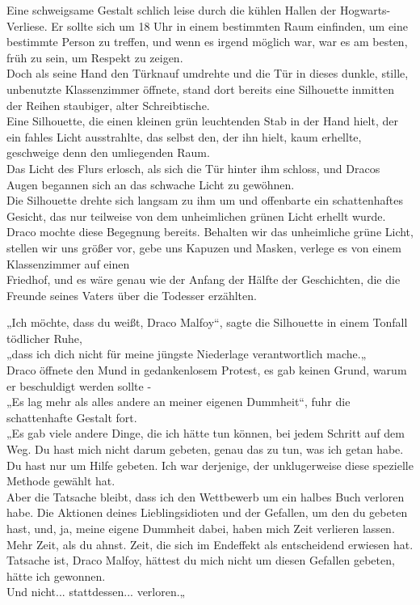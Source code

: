 {Eine schweigsame Gestalt schlich leise durch die kühlen Hallen der Hogwarts-Verliese. Er sollte sich um 18 Uhr in einem bestimmten Raum einfinden, um eine bestimmte Person zu treffen, und wenn es irgend möglich war, war es am besten, früh zu sein, um Respekt zu zeigen.\\ Doch als seine Hand den Türknauf umdrehte und die Tür in dieses dunkle, stille, unbenutzte Klassenzimmer öffnete, stand dort bereits eine Silhouette inmitten der Reihen staubiger, alter Schreibtische.\\ Eine Silhouette, die einen kleinen grün leuchtenden Stab in der Hand hielt, der ein fahles Licht ausstrahlte, das selbst den, der ihn hielt, kaum erhellte, geschweige denn den umliegenden Raum.\\ Das Licht des Flurs erlosch, als sich die Tür hinter ihm schloss, und Dracos Augen begannen sich an das schwache Licht zu gewöhnen.\\ Die Silhouette drehte sich langsam zu ihm um und offenbarte ein schattenhaftes Gesicht, das nur teilweise von dem unheimlichen grünen Licht erhellt wurde.\\ Draco mochte diese Begegnung bereits. Behalten wir das unheimliche grüne Licht, stellen wir uns größer vor, gebe uns Kapuzen und Masken, verlege es von einem Klassenzimmer auf einen\\ Friedhof, und es wäre genau wie der Anfang der Hälfte der Geschichten, die die Freunde seines Vaters über die Todesser erzählten.

„Ich möchte, dass du weißt, Draco Malfoy“, sagte die Silhouette in einem Tonfall tödlicher Ruhe,\\ „dass ich dich nicht für meine jüngste Niederlage verantwortlich mache.„\\ Draco öffnete den Mund in gedankenlosem Protest, es gab keinen Grund, warum er beschuldigt werden sollte -\\ „Es lag mehr als alles andere an meiner eigenen Dummheit“, fuhr die schattenhafte Gestalt fort.\\ „Es gab viele andere Dinge, die ich hätte tun können, bei jedem Schritt auf dem Weg. Du hast mich nicht darum gebeten, genau das zu tun, was ich getan habe.\\ Du hast nur um Hilfe gebeten. Ich war derjenige, der unklugerweise diese spezielle Methode gewählt hat.\\ Aber die Tatsache bleibt, dass ich den Wettbewerb um ein halbes Buch verloren habe. Die Aktionen deines Lieblingsidioten und der Gefallen, um den du gebeten hast, und, ja, meine eigene Dummheit dabei, haben mich Zeit verlieren lassen.\\ Mehr Zeit, als du ahnst. Zeit, die sich im Endeffekt als entscheidend erwiesen hat. Tatsache ist, Draco Malfoy, hättest du mich nicht um diesen Gefallen gebeten, hätte ich gewonnen.\\ Und nicht... stattdessen... verloren.„

}

